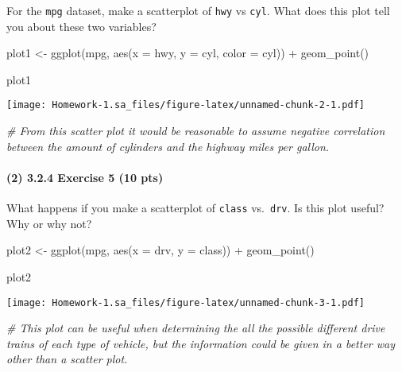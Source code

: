 \documentclass[
]{article}
\newenvironment{Shaded}{\begin{snugshade}}{\end{snugshade}}
\newcommand{\AttributeTok}[1]{\textcolor[rgb]{0.77,0.63,0.00}{#1}}
\newcommand{\CommentTok}[1]{\textcolor[rgb]{0.56,0.35,0.01}{\textit{#1}}}
\newcommand{\FunctionTok}[1]{\textcolor[rgb]{0.00,0.00,0.00}{#1}}
\newcommand{\NormalTok}[1]{#1}
\newcommand{\OtherTok}[1]{\textcolor[rgb]{0.56,0.35,0.01}{#1}}
\newcommand{\SpecialCharTok}[1]{\textcolor[rgb]{0.00,0.00,0.00}{#1}}
\begin{document}
For the \texttt{mpg} dataset, make a scatterplot of \texttt{hwy} vs
\texttt{cyl}. What does this plot tell you about these two variables?

\begin{Shaded}
\begin{Highlighting}[]
\NormalTok{plot1 }\OtherTok{\textless{}{-}} \FunctionTok{ggplot}\NormalTok{(mpg, }\FunctionTok{aes}\NormalTok{(}\AttributeTok{x =}\NormalTok{ hwy, }\AttributeTok{y =}\NormalTok{ cyl, }\AttributeTok{color =}\NormalTok{ cyl)) }\SpecialCharTok{+}
  \FunctionTok{geom\_point}\NormalTok{()}

\NormalTok{plot1}
\end{Highlighting}
\end{Shaded}

\texttt{[image: Homework-1.sa\_files/figure-latex/unnamed-chunk-2-1.pdf]}

\begin{Shaded}
\begin{Highlighting}[]
\CommentTok{\# From this scatter plot it would be reasonable to assume negative correlation between the amount of cylinders and the highway miles per gallon.}
\end{Highlighting}
\end{Shaded}

\hypertarget{exercise-5-10-pts}{%
\paragraph{(2) 3.2.4 Exercise 5 (10 pts)}\label{exercise-5-10-pts}}

What happens if you make a scatterplot of \texttt{class}
vs.~\texttt{drv}. Is this plot useful? Why or why not?

\begin{Shaded}
\begin{Highlighting}[]
\NormalTok{plot2 }\OtherTok{\textless{}{-}} \FunctionTok{ggplot}\NormalTok{(mpg, }\FunctionTok{aes}\NormalTok{(}\AttributeTok{x =}\NormalTok{ drv, }\AttributeTok{y =}\NormalTok{ class)) }\SpecialCharTok{+}
  \FunctionTok{geom\_point}\NormalTok{()}

\NormalTok{plot2}
\end{Highlighting}
\end{Shaded}

\texttt{[image: Homework-1.sa\_files/figure-latex/unnamed-chunk-3-1.pdf]}

\begin{Shaded}
\begin{Highlighting}[]
\CommentTok{\# This plot can be useful when determining the all the possible different drive trains of each type of vehicle, but the information could be given in a better way other than a scatter plot.}
\end{Highlighting}
\end{Shaded}
\end{document}
